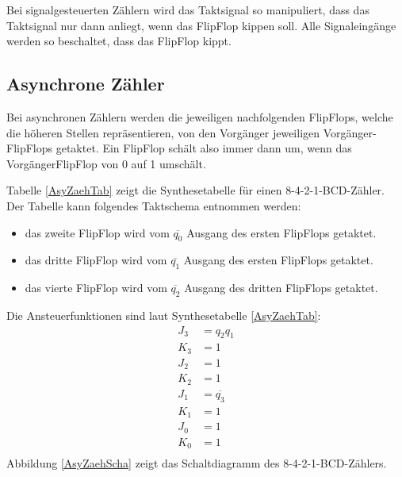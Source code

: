 Bei signalgesteuerten Zählern wird das Taktsignal so manipuliert, dass das Taktsignal nur dann anliegt, wenn das FlipFlop kippen soll. Alle Signaleingänge werden so beschaltet, dass das FlipFlop kippt.

\subsection{Asynchrone Zähler}
Bei asynchronen Zählern werden die jeweiligen nachfolgenden FlipFlops, welche die höheren Stellen repräsentieren, von den Vorgänger jeweiligen Vorgänger-FlipFlops getaktet. Ein FlipFlop schält also immer dann um, wenn das VorgängerFlipFlop von 0 auf 1 umschält.

Tabelle \ref{AsyZaehTab} zeigt die Synthesetabelle für einen 8-4-2-1-BCD-Zähler. Der Tabelle kann folgendes Taktschema entnommen werden:
\begin{itemize}
  \item das zweite FlipFlop wird vom $ \overline{q_0} $ Ausgang des ersten FlipFlops getaktet. 
  \item das dritte FlipFlop wird vom $ \overline{q_1} $ Ausgang des ersten FlipFlops getaktet. 
  \item das vierte FlipFlop wird vom $ \overline{q_2} $ Ausgang des dritten FlipFlops getaktet. 
\end{itemize}
Die Ansteuerfunktionen sind laut Synthesetabelle \ref{AsyZaehTab}:
\begin{align*}
	J_3 &= q_2q_1 \\
	K_3 &= 1 \\
	J_2 &= 1 \\
	K_2 &= 1 \\
	J_1 &= \overline{q_3} \\
	K_1 &= 1 \\
	J_0 &= 1 \\
	K_0 &= 1 \\
\end{align*}
Abbildung \ref{AsyZaehScha} zeigt das Schaltdiagramm des 8-4-2-1-BCD-Zählers.

